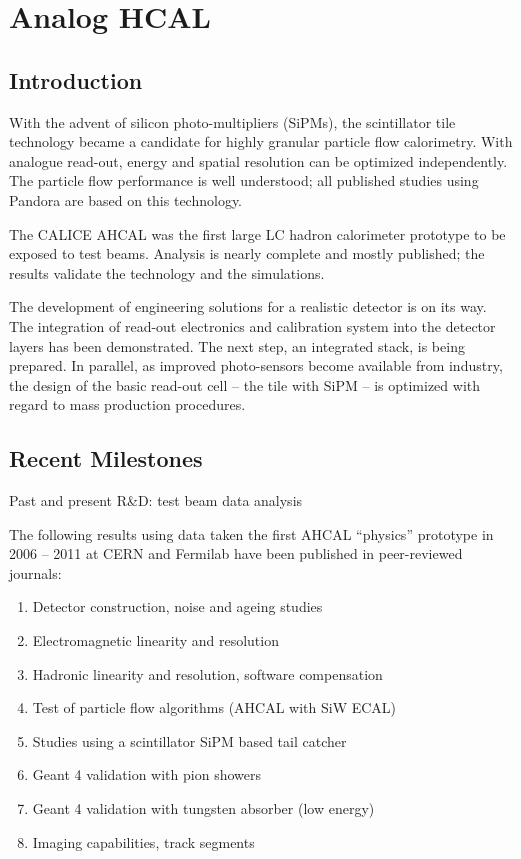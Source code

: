 \section{Analog HCAL}
\subsection{Introduction}
With the advent of silicon photo-multipliers (SiPMs), the scintillator tile technology became a candidate for highly granular particle flow calorimetry. With analogue read-out, energy and spatial resolution can be optimized independently. The particle flow performance is well understood; all published studies using Pandora are based on this technology.

The CALICE AHCAL was the first large LC hadron calorimeter prototype to be exposed to test beams. Analysis is nearly complete and mostly published; the results validate the technology and the simulations.

The development of engineering solutions for a realistic detector is on its way. The integration of read-out electronics and calibration system into the detector layers has been demonstrated. The next step, an integrated stack, is being prepared. In parallel, as improved photo-sensors become available from industry, the design of the basic read-out cell -- the tile with SiPM -- is optimized with regard to mass production procedures.

\subsection{Recent Milestones}
Past and present R\&D: test beam data analysis

The following results using data taken the first AHCAL ``physics'' prototype in 2006 -- 2011 at CERN and Fermilab have been published in peer-reviewed journals:
\begin{enumerate}
\item Detector construction, noise and ageing studies
\item Electromagnetic linearity and resolution
\item Hadronic linearity and resolution, software compensation
\item Test of particle flow algorithms (AHCAL with SiW ECAL)
\item Studies using a scintillator SiPM based tail catcher
\item Geant 4 validation with pion showers
\item Geant 4 validation with tungsten absorber (low energy)
\item Imaging capabilities, track segments
\end{enumerate}

